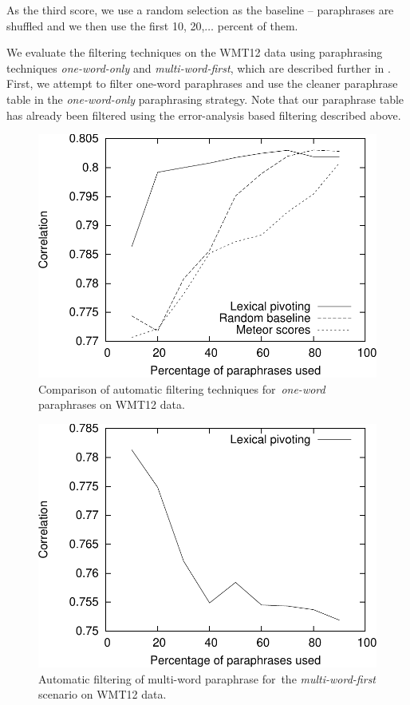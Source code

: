 As the third score, we use a random selection as the baseline -- paraphrases are shuffled and we then use the first 10, 20,$\ldots$ percent of them.

We evaluate the filtering techniques on the WMT12 data using paraphrasing techniques \emph{one-word-only} and  \emph{multi-word-first}, which are described further in .
First, we attempt to filter one-word paraphrases and use the cleaner paraphrase table in the \emph{one-word-only} paraphrasing strategy. 
Note that our paraphrase table has already been filtered using the error-analysis based filtering described above.

\begin{figure}[tb]
\begin{center}
\includegraphics[scale=0.55]{../img/filtering-lexical-cropped.pdf}
\caption{Comparison of automatic filtering techniques for~\emph{one-word} paraphrases on WMT12 data.}
\label{fig:filtering-lexical}
\end{center}
\end{figure}

\begin{figure}[tb]
\begin{center}
\includegraphics[scale=0.55]{../img/filtering-mwe-cropped.pdf}
\caption{Automatic filtering of multi-word paraphrase for~the \textit{multi-word-first} scenario on WMT12 data.}
\label{fig:filtering-mwe}
\end{center}
\end{figure}

